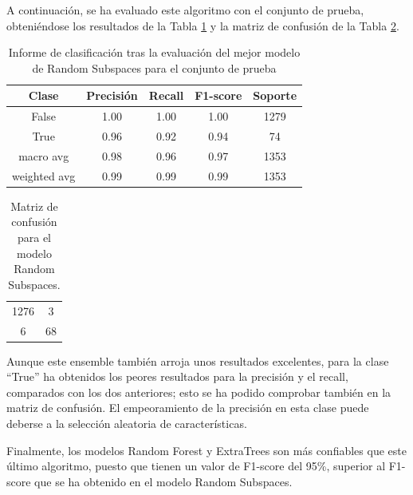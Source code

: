 \documentclass[12pt,letterpaper]{article}
\begin{document}
A continuación, se ha evaluado este algoritmo con el conjunto de prueba, obteniéndose los resultados de la Tabla \ref{tab:res-RS} y la matriz de confusión de la Tabla \ref{tab:confusion-RS}. 
\begin{table}[H]
    \centering
    \begin{tabular}{ccccc}
    \hline
    \textbf{Clase} & \textbf{Precisión} & \textbf{Recall} & \textbf{F1-score} & \textbf{Soporte} \\ \hline
    False & 1.00& 1.00 &  1.00 & 1279 \\ 
    True & 0.96 & 0.92 & 0.94 &  74 \\ 
    macro avg &  0.98 & 0.96 & 0.97 & 1353 \\ 
    weighted avg & 0.99 &  0.99 & 0.99 & 1353 \\ 
    \hline
    \end{tabular}
    \caption{Informe de clasificación tras la evaluación del mejor modelo de Random Subspaces para el conjunto de prueba}
    \label{tab:res-RS}
\end{table}

\begin{table}[H]
    \centering
    \begin{tabular}{|cc|}
    \hline
    1276 & 3 \\
    6 & 68 \\ \hline 
    \end{tabular}
    \caption{Matriz de confusión para el modelo Random Subspaces.}
    \label{tab:confusion-RS}
\end{table}

Aunque este ensemble también arroja unos resultados excelentes, para la clase ``True'' ha obtenidos los peores resultados para la precisión y el recall, comparados con los dos anteriores; esto se ha podido comprobar también en la matriz de confusión. El empeoramiento de la precisión en esta clase puede deberse a la selección aleatoria de características.

Finalmente, los modelos Random Forest y ExtraTrees son más confiables que este último algoritmo, puesto que tienen un valor de F1-score del 95\%, superior al F1-score que se ha obtenido en el modelo Random Subspaces.

\printbibliography
\end{document}
